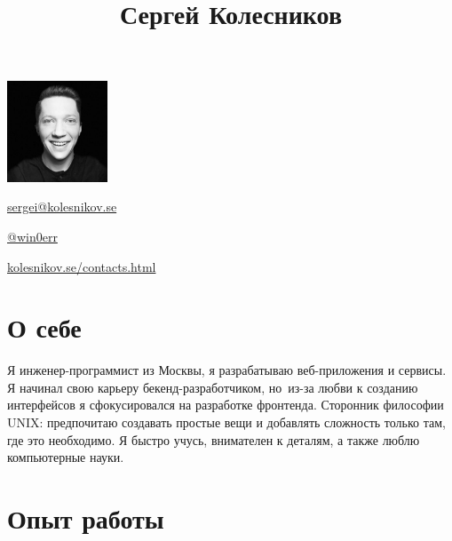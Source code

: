 \documentclass[10pt]{article}
\begin{document}
\begin{floatingfigure}[r]{3cm}
	\vspace{-.5\baselineskip}
	\includegraphics[width=3cm]{userpic}
\end{floatingfigure}

\title{Сергей Колесников}
\vspace{-.5\baselineskip}

\begin{horizontalitemize}
	\item \href{mailto:sergei@kolesnikov.se}{sergei@kolesnikov.se}
	\item \href{https://t.me/win0err}{@win0err}
	\item \href{https://kolesnikov.se/contacts.html}{kolesnikov.se/contacts.html}
\end{horizontalitemize}

\begin{summary}
\end{summary}


\vspace{-2\baselineskip}
\section{О себе}

Я инженер-программист из Москвы, я разрабатываю веб-приложения и сервисы.
Я начинал свою карьеру бекенд-разработчиком, но~из-за любви к созданию интерфейсов я сфокусировался на разработке фронтенда.
Сторонник философии UNIX: предпочитаю создавать простые вещи и добавлять сложность только там, где это необходимо.
Я быстро учусь, внимателен к деталям, а также люблю компьютерные науки.


\section{Опыт работы}
\end{document}
